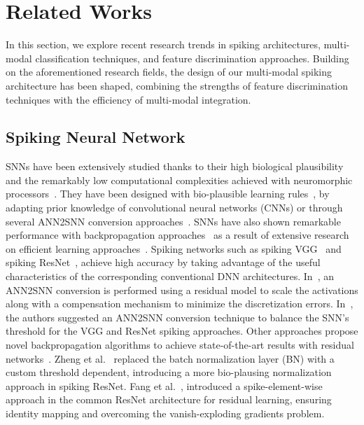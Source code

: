 \section{Related Works}
In this section, we explore recent research trends in spiking architectures, multi-modal classification techniques, and feature discrimination approaches.
Building on the aforementioned research fields, the design of our multi-modal spiking architecture has been shaped, combining the strengths of feature discrimination techniques with the efficiency of multi-modal integration.

\subsection{Spiking Neural Network}

SNNs have been extensively studied thanks to their high biological plausibility and the remarkably low computational complexities achieved with neuromorphic processors~\cite{davies2021advancing,massa2020efficient}. 
They have been designed with bio-plausible learning rules~\cite{iakymchuk2015simplified,hao2020biologically,kheradpisheh2018stdp}, by adapting prior knowledge of convolutional neural networks (CNNs) or through several ANN2SNN conversion approaches~\cite{bu2023optimal,wang2024universal,wang2023new}.
SNNs have also shown remarkable performance with backpropagation approaches~\cite{deng2022temporal,guo2023membrane, lee2020enabling} as a result of extensive research on efficient learning approaches~\cite{meng2023towards, wei2023temporal}.
Spiking networks such as spiking VGG~\cite{lee2020enabling,sengupta2019going} and spiking ResNet~\cite{shi2024spikingresformer,zheng2021going,fang2021deep,zhou2023spikingformer,hu2021spiking}, achieve high accuracy by taking advantage of the useful characteristics of the corresponding conventional DNN architectures.
In~\cite{hu2021spiking}, an ANN2SNN conversion is performed using a residual model to scale the activations along with a compensation mechanism to minimize the discretization errors.
In~\cite{sengupta2019going}, the authors suggested an ANN2SNN conversion technique to balance the SNN's threshold for the VGG and ResNet spiking approaches. 
Other approaches propose novel backpropagation algorithms to achieve state-of-the-art results with residual networks~\cite{lee2020enabling}.
Zheng et al.~\cite{zheng2021going} replaced the batch normalization layer (BN) with a custom threshold dependent, introducing a more bio-plausing normalization approach in spiking ResNet.
Fang et al.~\cite{fang2021deep}, introduced a spike-element-wise approach in the common ResNet architecture for residual learning, ensuring identity mapping and overcoming the vanish-exploding gradients problem.



